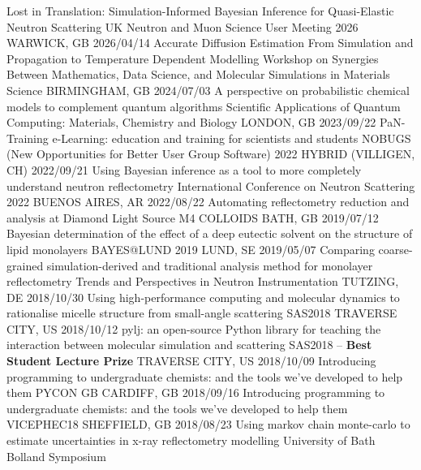 \begin{dayenumerate}
  \cvpresentation
    {Lost in Translation: Simulation-Informed Bayesian Inference for Quasi-Elastic Neutron Scattering}
	{UK Neutron and Muon Science User Meeting 2026}
	{WARWICK, GB}
	{2026/04/14}
  \cvpresentation
    {Accurate Diffusion Estimation From Simulation and Propagation to Temperature Dependent Modelling}
    {Workshop on Synergies Between Mathematics, Data Science, and Molecular Simulations in Materials Science}
    {BIRMINGHAM, GB}
    {2024/07/03}
  \cvpresentation
    {A perspective on probabilistic chemical models to complement quantum algorithms}
    {Scientific Applications of Quantum Computing: Materials, Chemistry and Biology}
    {LONDON, GB}
    {2023/09/22}
  \cvpresentation
    {PaN-Training e-Learning: education and training for scientists and students}
    {NOBUGS (New Opportunities for Better User Group Software) 2022}
    {HYBRID (VILLIGEN, CH)}
    {2022/09/21}
  \cvpresentation
    {Using Bayesian inference as a tool to more completely understand neutron reflectometry}
    {International Conference on Neutron Scattering 2022}
    {BUENOS AIRES, AR}
    {2022/08/22}
  \cvpresentation
    {Automating reflectometry reduction and analysis at Diamond Light Source}
    {M4 COLLOIDS}
    {BATH, GB}
    {2019/07/12}
  \cvpresentation
    {Bayesian determination of the effect of a deep eutectic solvent on the structure of lipid monolayers}
    {BAYES@LUND 2019}
    {LUND, SE}
    {2019/05/07}
  \cvpresentation
    {Comparing coarse-grained simulation-derived and traditional analysis method for monolayer reflectometry}
    {Trends and Perspectives in Neutron Instrumentation}
    {TUTZING, DE}
    {2018/10/30} 
  \cvpresentation
    {Using high-performance computing and molecular dynamics to rationalise micelle structure from small-angle scattering}
    {SAS2018}
    {TRAVERSE CITY, US}
    {2018/10/12}
  \cvpresentation
    {pylj: an open-source Python library for teaching the interaction between molecular simulation and scattering}
	{SAS2018 -- \textbf{Best Student Lecture Prize}}
    {TRAVERSE CITY, US}
    {2018/10/09}
  \cvpresentation
    {Introducing programming to undergraduate chemists: and the tools we've developed to help them}
    {PYCON GB}
    {CARDIFF, GB}
    {2018/09/16}
  \cvpresentation
    {Introducing programming to undergraduate chemists: and the tools we've developed to help them}
    {VICEPHEC18}
    {SHEFFIELD, GB}
    {2018/08/23}
  \cvpresentation
    {Using markov chain monte-carlo to estimate uncertainties in x-ray reflectometry modelling}
    {University of Bath Bolland Symposium}

\end{dayenumerate}
